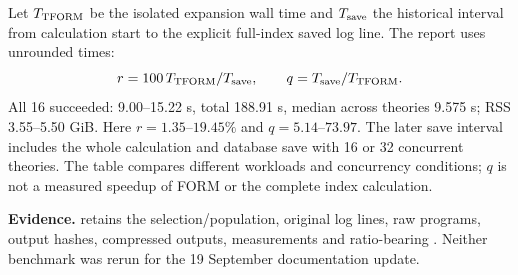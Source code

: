 Let $T_{\rm TFORM}$ be the isolated expansion wall time and $T_{\rm save}$
the historical interval from calculation start to the explicit full-index
saved log line. The report uses unrounded times:
\[
 r=100\,T_{\rm TFORM}/T_{\rm save},\qquad
 q=T_{\rm save}/T_{\rm TFORM}.
\]
All 16 succeeded: 9.00--15.22 s, total 188.91 s, median across theories
9.575 s; RSS 3.55--5.50 GiB. Here $r=1.35$--$19.45\%$ and
$q=5.14$--$73.97$. The later save interval includes the whole calculation
and database save with 16 or 32 concurrent theories. The table compares
different workloads and concurrency conditions; $q$ is not a measured
speedup of FORM or the complete index calculation.

\textbf{Evidence.}
retains the selection/population, original log lines, raw programs, output
hashes, compressed outputs, measurements and ratio-bearing .
Neither benchmark was rerun for the 19 September documentation update.

